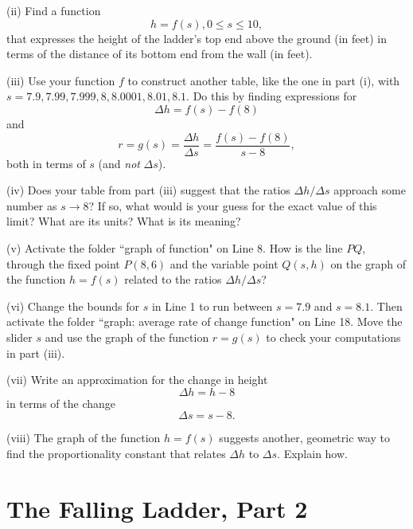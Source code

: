 \documentclass{ximera}
\begin{document}
\begin{example}
\begin{question}
(ii) Find a function
\[
  h = f(s) , 0\leq s \leq 10 ,
\]
that expresses the height of the ladder's top end above the ground (in feet) in terms of the distance of its bottom end from the wall (in feet). %

(iii) Use your function $f$ to construct another table, like the one in part (i), with $s=7.9, 7.99, 7.999,8, 8.0001, 8.01, 8.1$. Do this by finding expressions for 
\[
    \Delta h = f(s) - f(8)
\]
and
\[
   r = g(s) = \frac{\Delta h}{\Delta s} = \frac{f(s) - f(8)}{s-8} ,
\]
both in terms of $s$ (and \emph{not} $\Delta s$).

(iv) Does  your table from part (iii) suggest that the ratios $\Delta h/ \Delta s$ approach some number as $s\to 8$? If so, what would is your guess for the exact value of this limit? What are its units? What is its meaning?

(v) Activate the folder ``graph of function" on Line 8. How is the line $PQ$, through the fixed point $P(8,6)$ and the variable point $Q(s,h)$ on the graph of the function $h=f(s)$ related to the ratios $\Delta h / \Delta s$?

(vi) Change the bounds for $s$ in Line 1 to run between $s=7.9$ and $s=8.1$. Then activate the folder ``graph: average rate of change function" on Line 18. Move the slider $s$ and use the graph of the function $r=g(s)$ to check your computations in part (iii).

(vii) Write an approximation for the change in height
\[
   \Delta h = h-8
\]
in terms of the change
\[
  \Delta s = s - 8 .
\]  

(viii) The graph of the function $h=f(s)$ suggests another, geometric way to find the proportionality constant that relates $\Delta h$ to $\Delta s$. Explain how.

\end{question}

\end{example}

\section{The Falling Ladder, Part 2}
\end{document}
